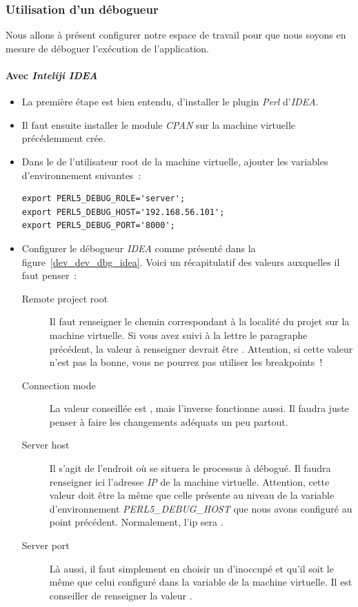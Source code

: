 \subsubsection{Utilisation d'un débogueur}

Nous allons à présent configurer notre espace de travail pour que nous soyons en mesure de déboguer l'exécution de l'application.

\paragraph{Avec \emph{Inteliji IDEA}}

\begin{itemize}
	\item La première étape est bien entendu, d'installer le plugin \emph{Perl} d'\emph{IDEA}.
	\item Il faut ensuite installer le module \emph{CPAN}  sur la machine virtuelle précédemment crée.
	\item Dans le  de l'utilisateur root de la machine virtuelle, ajouter les variables d'environnement suivantes~:
		\begin{lstlisting}
export PERL5_DEBUG_ROLE='server';
export PERL5_DEBUG_HOST='192.168.56.101';
export PERL5_DEBUG_PORT='8000';
		\end{lstlisting}
	\item Configurer le débogueur \emph{IDEA} comme présenté dans la figure~\ref{dev_dev_dbg_idea}.
		Voici un récapitulatif des valeurs auxquelles il faut penser~:
		\begin{description}
			\item[Remote project root] Il faut renseigner le chemin correspondant à la localité du projet sur la machine virtuelle. Si vous avez suivi à la lettre le paragraphe précédent, la valeur à renseigner devrait être . Attention, si cette valeur n'est pas la bonne, vous ne pourrez pas utiliser les breakpoints~!
			\item[Connection mode] La valeur conseillée est , mais l'inverse fonctionne aussi. Il faudra juste penser à faire les changements adéquats un peu partout.
			\item[Server host] Il s'agit de l'endroit où se situera le processus à débogué. Il faudra renseigner ici l'adresse \emph{IP} de la machine virtuelle. Attention, cette valeur doit être la même que celle présente au niveau de la variable d'environnement \emph{PERL5\_DEBUG\_HOST} que nous avons configuré au point précédent. Normalement, l'ip sera .
			\item[Server port] Là aussi, il faut simplement en choisir un d'inoccupé et qu'il soit le même que celui configuré dans la variable  de la machine virtuelle. Il est conseiller de renseigner la valeur .
		\end{description}
\end{itemize}

